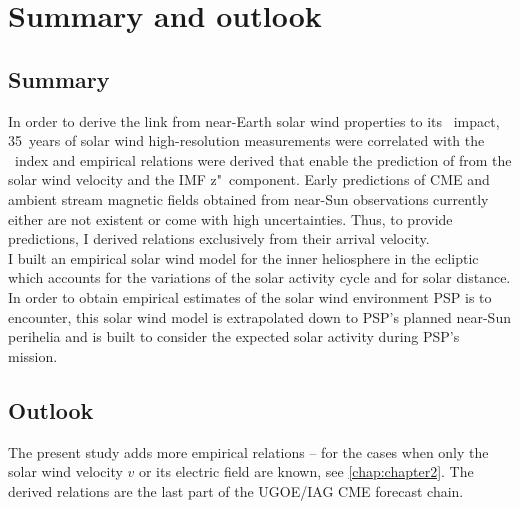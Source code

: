 
\chapter{Summary and outlook}
\label{chap:summary}


% 

\section{Summary}

In order to derive the link from near-Earth solar wind properties to its \Kp{}~impact, 35~years of solar wind high-resolution measurements were correlated with the \Kp~index and empirical relations were derived that enable the prediction of \Kp{} from the solar wind velocity and the IMF z"~component. Early predictions of CME and ambient stream magnetic fields obtained from near-Sun observations currently either are not existent or come with high uncertainties. Thus, to provide \Kp{} predictions, I derived relations exclusively from their arrival velocity.\\


I built an empirical solar wind model for the inner heliosphere in the ecliptic which accounts for the variations of the solar activity cycle and for solar distance. In order to obtain empirical estimates of the solar wind environment PSP is to encounter, this solar wind model is extrapolated down to PSP's planned near-Sun perihelia and is built to consider the expected solar activity during PSP's mission.\\



\section{Outlook}

The present study adds more empirical \Kp{} relations -- for the cases when only the solar wind velocity $v$ or its electric field \vBz{} are known, see \autoref{chap:chapter2}. The derived \Kp{} relations are the last part of the UGOE/IAG CME forecast chain.\\

